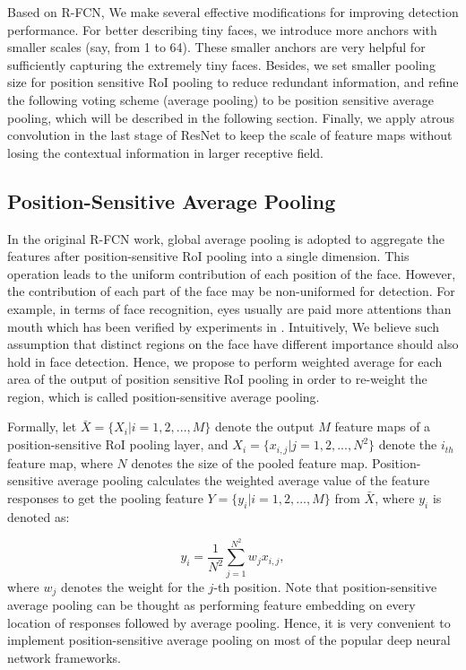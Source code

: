\documentclass{article} %
\newcommand{\ignore}[1]{}
\begin{document}
Based on R-FCN, We make several effective modifications for improving detection performance. For better describing tiny faces, we introduce more anchors with smaller scales (say, from 1 to 64). These smaller anchors are very helpful for sufficiently capturing the extremely tiny faces. Besides, we set smaller pooling size for position sensitive RoI pooling to reduce redundant information, and refine the following voting scheme (average pooling) to be position sensitive average pooling, which will be described in the following section. Finally, we apply atrous convolution in the last stage of ResNet to keep the scale of feature maps without losing the contextual information in larger receptive field\ignore{large receptive field}. 





\subsection{Position-Sensitive Average Pooling}

In the original R-FCN work, global average pooling is adopted to aggregate the features after position-sensitive RoI pooling into a single dimension. This operation leads to the uniform\ignore{equal} contribution of each position of the face. However, the contribution of each part of the face may be non-uniformed\ignore{not equal} for detection. For example, in terms of face recognition, eyes usually are paid more attentions than mouth which has been verified by experiments in \cite{ARdatabase}. 
Intuitively, We believe such assumption that distinct regions on the face have different importance should also hold in face detection. Hence, we propose to perform weighted average for each area of the output of position sensitive RoI pooling in order to re-weight the region, which is called position-sensitive average pooling. 


Formally, let $\bar X = \{ {X_i}|i = 1,2,...,M\}$ denote the output $M$ feature maps of a position-sensitive RoI pooling layer, and ${X_i} = \{ {x_{i,j}}|j = 1,2,...,N^2 \}$ denote the $i_{th}$ feature map, where $N$ denotes the size of the pooled feature map. Position-sensitive average pooling calculates the weighted average value of the feature responses to get the pooling feature $Y = \{ {y_i}|i = 1,2,...,M\}$ from $\bar X$, where $y_i$ is denoted as:

\begin{equation}
\label{equ:intra}
{y_i} = \frac{1}{{{N^2}}}\sum\limits_{j = 1}^{{N^2}} {w_{j} x_{i,j}},
\end{equation}
where $w_{j}$ denotes the weight for the $j$-th position.
Note that position-sensitive average pooling can be thought as performing feature embedding on every location of responses followed by average pooling. Hence, it is very convenient to implement position-sensitive average pooling on most of the popular deep neural network frameworks.
\end{document}
